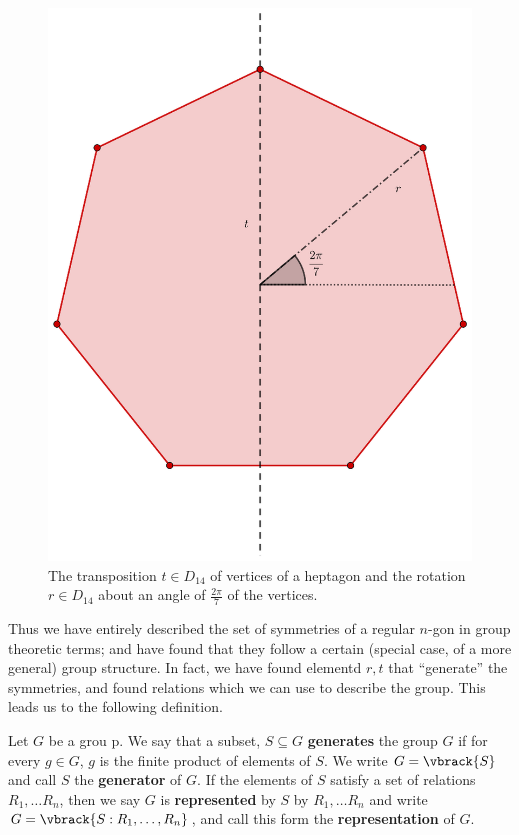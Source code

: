 \begin{figure}
    \centering
    \includegraphics[scale=0.2]{Figures/Chapter1/D_14.eps}
    \caption{The transposition $t \in D_{14}$ of vertices of a heptagon and the
    rotation $r \in D_{14}$ about an angle of $\frac{2\pi}{7}$ of the vertices.}
    \label{fig_1.1}
\end{figure}

Thus we have entirely described the set of symmetries of a regular $n$-gon in
group theoretic terms; and have found that they follow a certain  (special case,
of a more general) group structure. In fact, we have found elementd $r,t$ that
``generate'' the symmetries, and found relations which we can use to describe
the group. This leads us to the following definition.

\begin{definition}
    Let $G$ be a grou p. We say that a subset, $S \subseteq G$
    \textbf{generates} the group $G$ if for every  $g \in G$,  $g$ is the finite
    product of elements of  $S$. We write  $G=\vbrack{S}$ and call $S$ the
    \textbf{generator} of $G$. If the elements of  $S$ satisfy a set of
    relations  $R_1, \dots R_n$, then we say $G$ is  \textbf{represented} by $S$
    by $R_1, \dots R_n$ and write $G=\vbrack{S : R_1, \dots, R_n}$, and call
    this form the \textbf{representation} of $G$.
\end{definition}

